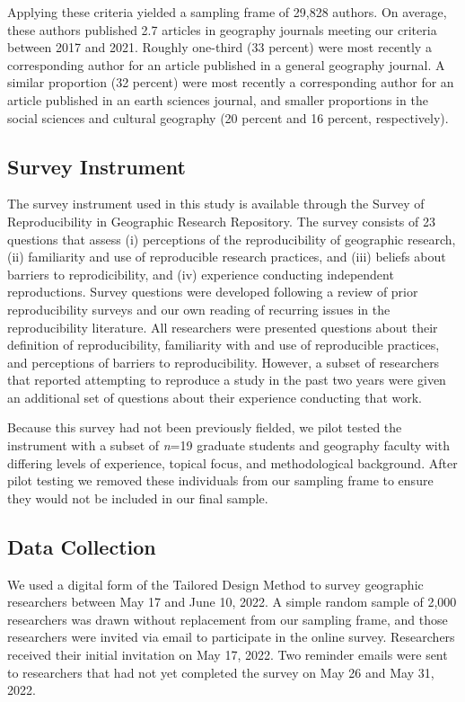 \documentclass[]{interact}
\theoremstyle{plain}%
\theoremstyle{definition}
\theoremstyle{remark}
\begin{document}
Applying these criteria yielded a sampling frame of 29,828 authors. 
On average, these authors published 2.7 articles in geography journals meeting our criteria between 2017 and 2021. 
Roughly one-third (33 percent) were most recently a corresponding author for an article published in a general geography journal. 
A similar proportion (32 percent) were most recently a corresponding author for an article published in an earth sciences journal, and smaller proportions in the social sciences and cultural geography (20 percent and 16 percent, respectively).

\subsection*{Survey Instrument}
The survey instrument used in this study is available through the Survey of Reproducibility in Geographic Research Repository.
The survey consists of 23 questions that assess (i) perceptions of the reproducibility of geographic research, (ii) familiarity and use of reproducible research practices, and (iii) beliefs about barriers to reprodicibility, and (iv) experience conducting independent reproductions. 
Survey questions were developed following a review of prior reproducibility surveys \citep[e.g.,][]{fanelli2009many,baker20161, konkol2019} and our own reading of recurring issues in the reproducibility literature. 
All researchers were presented questions about their definition of reproducibility, familiarity with and use of reproducible practices, and perceptions of barriers to reproducibility. 
However, a subset of researchers that reported attempting to reproduce a study in the past two years were given an additional set of questions about their experience conducting that work.

Because this survey had not been previously fielded, we pilot tested the instrument with a subset of \textit{n}=19 graduate students and geography faculty with differing levels of experience, topical focus, and methodological background. 
After pilot testing we removed these individuals from our sampling frame to ensure they would not be included in our final sample.

\subsection*{Data Collection}
We used a digital form of the Tailored Design Method \citep{dillman2014internet} to survey geographic researchers between May 17 and June 10, 2022.
A simple random sample of 2,000 researchers was drawn without replacement from our sampling frame, and those researchers were invited via email to participate in the online survey. 
Researchers received their initial invitation on May 17, 2022. 
Two reminder emails were sent to researchers that had not yet completed the survey on May 26 and May 31, 2022.
\end{document}
